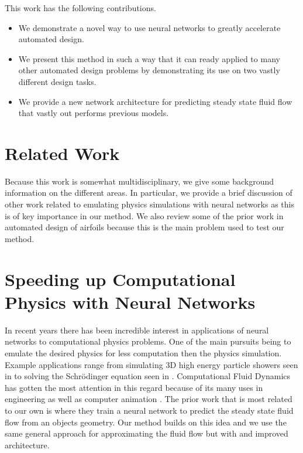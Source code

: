 \documentclass{article} %
\begin{document}
This work has the following contributions.
\begin{itemize}
  \item We demonstrate a novel way to use neural networks to greatly accelerate automated design.
  \item We present this method in such a way that it can ready applied to many other automated design problems by demonstrating its use on two vastly different design tasks.
  \item We provide a new network architecture for predicting steady state fluid flow that vastly out performs previous models.
\end{itemize}

\section{Related Work}

Because this work is somewhat multidisciplinary, we give some background information on the different areas. In particular, we provide a brief discussion of other work related to emulating physics simulations with neural networks as this is of key importance in our method. We also review some of the prior work in automated design of airfoils because this is the main problem used to test our method.

\section{Speeding up Computational Physics with Neural Networks}

In recent years there has been incredible interest in applications of neural networks to computational physics problems. One of the main pursuits being to emulate the desired physics for less computation then the physics simulation. Example applications range from simulating 3D high energy particle showers seen in \citep{2017arXiv170502355P} to solving the Schrödinger equation seen in \citep{mills2017deep}. Computational Fluid Dynamics has gotten the most attention in this regard because of its many uses in engineering as well as computer animation \cite{tompson2016accelerating} \cite{2017arXiv170509036H}. The prior work that is most related to our own is \citep{guo2016convolutional} where they train a neural network to predict the steady state fluid flow from an objects geometry. Our method builds on this idea and we use the same general approach for approximating the fluid flow but with and improved architecture.
\end{document}
